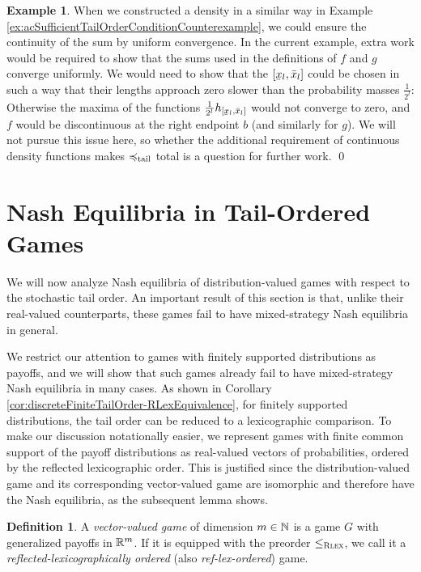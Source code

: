 \documentclass[a4paper,DIV=11,abstracton,twoside=semi]{scrreprt}
\theoremstyle{definition}
\newtheorem{defn}[thm]{Definition} %
\newtheorem{ex}[thm]{Example} %
\begin{document}
\begin{ex}
        When we constructed a density in a similar way in Example \ref{ex:acSufficientTailOrderConditionCounterexample},
        we could ensure the continuity of the sum by uniform convergence.
        In the current example, extra work would be required  to show that the sums used in the definitions of $f$ and $g$ converge uniformly.
        We would need to show that the $[\ubar{x}_l, \bar{x}_l]$ could be chosen in such a way that their lengths approach zero slower than the probability masses $\frac{1}{2^l}$: Otherwise the maxima of the functions $\frac{1}{2^l} h_{[\ubar{x}_l, \bar{x}_l]}$ would not converge to zero, and $f$ would be discontinuous at the right endpoint $b$ (and similarly for $g$).
        We will not pursue this issue here, so whether the additional requirement of continuous density functions makes $\preccurlyeq_{\text{tail}}$ total is a question for further work.
        \qed
    \end{ex}


    \section{Nash Equilibria in Tail-Ordered Games}
    \label{sec:equilibriaInTailOrderedGames}
    We will now analyze Nash equilibria of distribution-valued games with respect to the stochastic tail order.
    An important result of this section is that, unlike their real-valued counterparts, these games fail to have mixed-strategy Nash equilibria in general.
    
    We restrict our attention to games with finitely supported distributions as payoffs, and we will show that such games already fail to have mixed-strategy Nash equilibria in many cases.
    As shown in Corollary \ref{cor:discreteFiniteTailOrder-RLexEquivalence}, for finitely supported distributions, the tail order can be reduced to a lexicographic comparison.
    To make our discussion notationally easier, we represent games with finite common support of the payoff distributions as real-valued vectors of probabilities, ordered by the reflected lexicographic order. This is justified since the distribution-valued game and its corresponding vector-valued game are isomorphic and therefore have the Nash equilibria, as the subsequent lemma shows.
    \begin{defn}
        A \emph{vector-valued game} of dimension $m \in \mathbb{N}$ is a game $G$ with generalized payoffs in $\mathbb{R}^m$.
        If it is equipped with the preorder $\leq_{\textsc{Rlex}}$, we call it a \emph{reflected-lexicographically ordered} (also \emph{ref-lex-ordered}) game.
        \label{def:vectorValuedGame}
    \end{defn}
\end{document}

